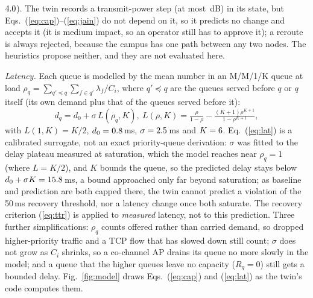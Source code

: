 \documentclass[conference]{IEEEtran}
\begin{document}
$4.0$). The twin records a transmit-power step (at most \CfgTxStep\,dB) in its state, but Eqs.~(\ref{eq:cap})--(\ref{eq:jain}) do not depend on it, so it predicts no change and accepts it (it is medium impact, so an operator still has to approve it); a reroute is always rejected, because the campus has one path between any two nodes. The heuristics propose neither, and they are not evaluated here.

\emph{Latency.} Each queue is modelled by the mean number in an M/M/1/K queue \cite{kleinrock1975} at load $\rho_q=\sum_{q'\preceq q}\sum_{f\in q'}\lambda_f/C_i$, where $q'\preceq q$ are the queues served before $q$ or $q$ itself (its own demand plus that of the queues served before it):
\begin{equation}
\boxed{d_q=d_0+\sigma\,L(\rho_q,K),\ L(\rho,K)=\tfrac{\rho}{1-\rho}-\tfrac{(K+1)\rho^{K+1}}{1-\rho^{K+1}}},
\label{eq:lat}
\end{equation}
with $L(1,K)=K/2$, $d_0=0.8$\,ms, $\sigma=2.5$\,ms and $K=6$. Eq.~(\ref{eq:lat}) is a calibrated surrogate, not an exact priority-queue derivation: $\sigma$ was fitted to the delay plateau measured at saturation, which the model reaches near $\rho_q=1$ (where $L=K/2$), and $K$ bounds the queue, so the predicted delay stays below $d_0+\sigma K=15.8$\,ms, a bound approached only far beyond saturation; as baseline and prediction are both capped there, the twin cannot predict a violation of the 50\,ms recovery threshold, nor a latency change once both saturate. The recovery criterion (\ref{eq:ttr}) is applied to \emph{measured} latency, not to this prediction. Three further simplifications: $\rho_q$ counts offered rather than carried demand, so dropped higher-priority traffic and a TCP flow that has slowed down still count; $\sigma$ does not grow as $C_i$ shrinks, so a co-channel AP drains its queue no more slowly in the model; and a queue that the higher queues leave no capacity ($R_q=0$) still gets a bounded delay. Fig.~\ref{fig:model} draws Eqs.~(\ref{eq:cap}) and (\ref{eq:lat}) as the twin's code computes them.
\end{document}
